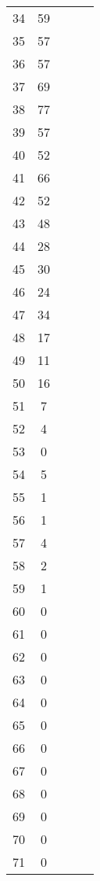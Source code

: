 \begin{center}
\begin{table}[H]
\begin{tabular}{ccccc}
\num{   34} & \num{   59} \\
\num{   35} & \num{   57} \\
\num{   36} & \num{   57} \\
\num{   37} & \num{   69} \\
\num{   38} & \num{   77} \\
\num{   39} & \num{   57} \\
\num{   40} & \num{   52} \\
\num{   41} & \num{   66} \\
\num{   42} & \num{   52} \\
\num{   43} & \num{   48} \\
\num{   44} & \num{   28} \\
\num{   45} & \num{   30} \\
\num{   46} & \num{   24} \\
\num{   47} & \num{   34} \\
\num{   48} & \num{   17} \\
\num{   49} & \num{   11} \\
\num{   50} & \num{   16} \\
\num{   51} & \num{    7} \\
\num{   52} & \num{    4} \\
\num{   53} & \num{    0} \\
\num{   54} & \num{    5} \\
\num{   55} & \num{    1} \\
\num{   56} & \num{    1} \\
\num{   57} & \num{    4} \\
\num{   58} & \num{    2} \\
\num{   59} & \num{    1} \\
\num{   60} & \num{    0} \\
\num{   61} & \num{    0} \\
\num{   62} & \num{    0} \\
\num{   63} & \num{    0} \\
\num{   64} & \num{    0} \\
\num{   65} & \num{    0} \\
\num{   66} & \num{    0} \\
\num{   67} & \num{    0} \\
\num{   68} & \num{    0} \\
\num{   69} & \num{    0} \\
\num{   70} & \num{    0} \\
\num{   71} & \num{    0} \\

\end{tabular}
\end{table}
\end{center}
